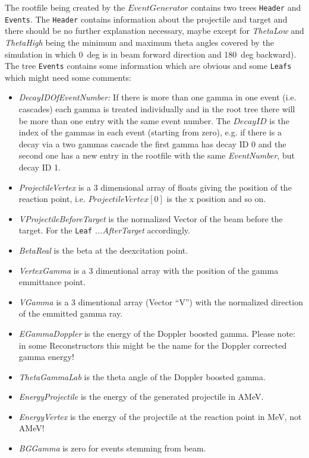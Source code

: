 \documentclass[12pt]{book}
\begin{document}
The rootfile being created by the $EventGenerator$ contains two trees \texttt{Header} and \texttt{Events}. The \texttt{Header} contains information about the projectile and target and there should be no further explanation necessary, maybe except for \textit{ThetaLow} and \textit{ThetaHigh} being the minimum and maximum theta angles covered by the simulation in which 0~deg is in beam forward direction and 180~deg backward).\\
The tree \texttt{Events} contains some information which are obvious and some \texttt{Leafs} which might need some comments:
\begin{itemize}
	\item \textit{DecayIDOfEventNumber:} If there is more than one gamma in one event (i.e. cascades) each gamma is treated individually and in the root tree there will be more than one entry with the same event number. The $DecayID$ is the index of the gammas in each event (starting from zero), e.g. if there is a decay via a two gammas cascade the first gamma has decay ID 0 and the second one has a new entry in the rootfile with the same \textit{EventNumber}, but decay ID 1.
	
	\item \textit{ProjectileVertex} is a 3 dimensional array of floats giving the position of the reaction point, i.e. $ProjectileVertex[0]$ is the x position and so on.
	
	\item \textit{VProjectileBeforeTarget} is the normalized Vector of the beam before the target. For the \texttt{Leaf} \textit{...AfterTarget} accordingly.
	
	\item \textit{BetaReal} is the beta at the deexcitation point.
	 
	\item \textit{VertexGamma} is a 3 dimentional array with the position of the gamma emmittance point.
	
	\item \textit{VGamma} is a 3 dimentional array (Vector ``V'') with the normalized direction of the emmitted gamma ray.
	
	\item \textit{EGammaDoppler} is the energy of the Doppler boosted gamma. Please note: in some Reconstructors this might be the name for the Doppler corrected gamma energy!
	
	\item \textit{ThetaGammaLab} is the theta angle of the Doppler boosted gamma.
	
	\item \textit{EnergyProjectile} is the energy of the generated projectile in AMeV.
	\item \textit{EnergyVertex} is the energy of the projectile at the reaction point in MeV, not AMeV!
	
	\item \textit{BGGamma} is zero for events stemming from beam.
\end{itemize}
\end{document}
